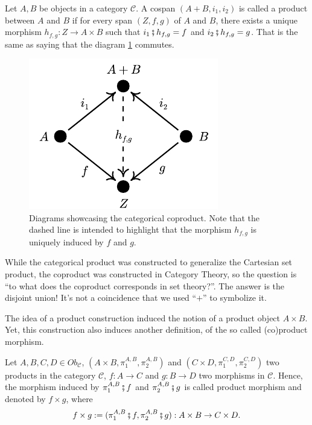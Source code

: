 \begin{definition}
	Let $A,B$ be objects in a  category $\mathcal C$. A cospan $(A + B, i_1, i_2)$
	is called a product between $A$ and $B$ if for every span $(Z, f, g)$ of $A$ and $B$,
	there exists a unique morphism $h_{f,g}:Z \to A \times B$ such that
	$i_1 \fatsemi h_{f,g} = f$ and $i_2 \fatsemi h_{f,g} = g$. That is the same
	as saying that the diagram \ref{fig:Coproduct} commutes.
\end{definition}

\begin{figure}[H]
	\begin{center}
		\includegraphics{./notebooks/CategoricalCoproduct.pdf}
	\end{center}
	\caption{Diagrams showcasing the categorical coproduct. Note that the dashed line
		is intended to highlight that the morphism $h_{f,g}$ is uniquely induced by $f$ and $g$.}
	\label{fig:Coproduct}
\end{figure}

While the categorical product was constructed to generalize the Cartesian set product,
the coproduct was constructed in Category Theory, so the question is
``to what does the coproduct corresponds in set theory?''. The answer is the
disjoint union! It's not a coincidence that we used ``$+$'' to symbolize it.

The idea of a product construction induced the notion of a product object
$A \times B$. Yet, this construction also induces another definition, of the
so called (co)product morphism.

\begin{definition}
	Let $A, B, C, D \in Ob_\mathcal C$,
	$(A\times B, \pi^{A,B}_1, \pi^{A,B}_2)$ and
	$(C\times D, \pi^{C,D}_1, \pi^{C,D}_2)$ two products in the category $\mathcal C$,
	$f:A\to C$ and $g:B \to D$ two morphisms in $\mathcal C$. Hence, the
	morphism induced by $\pi_1^{A,B} \fatsemi f$ and $\pi_2^{A,B} \fatsemi g$ is
	called product morphism and denoted by $f \times g$, where
	\begin{displaymath}
		f \times g := (\pi_1^{A,B} \fatsemi f, \pi_2^{A,B} \fatsemi g): A\times B \to C \times D.
	\end{displaymath}
\end{definition}

